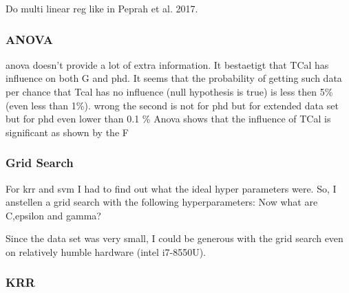 Do multi linear reg like in Peprah et al. 2017\cite{peprah2017appraisal}.


\subsubsection{ANOVA}\label{sec:res-anova}
\Gls{anova} doesn't provide a lot of extra information. 
It bestaetigt that TCal has influence on both G and phd. 
It seems that the probability of getting such data per chance that Tcal has no influence 
(null hypothesis is true) is less then 5\% (even less than 1\%). 
wrong the second is not for phd but for extended data set
but for phd even lower than 0.1 \%
Anova shows that the influence of TCal is significant as shown by the F 

\iffalse
\subsubsection{Grid Search}
For \gls{krr} and {svm} I had to find out what the ideal hyper parameters were. 
So, I anstellen a grid search with the following hyperparameters: 
Now what are C,epsilon and gamma? 

Since the data set was very small, I could be generous with the grid search even on relatively humble hardware (intel i7-8550U). 

\subsubsection{KRR}

